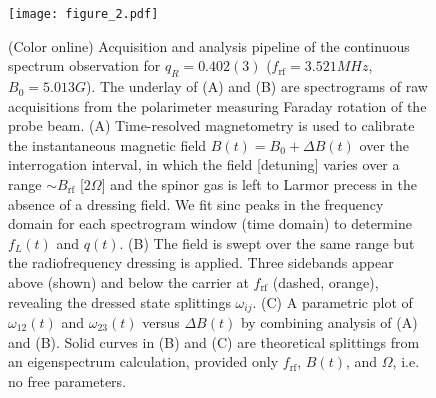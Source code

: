 \documentclass[aps,prl,reprint,superscriptaddress,floatfix]{revtex4-1}
\begin{document}
\begin{figure}
    \centering
    \texttt{[image: figure\_2.pdf]}
    \caption{
    \label{fig:acquisition_pipeline}
        (Color online)
        Acquisition and analysis pipeline of the continuous spectrum observation for $q_R = 0.402(3)$ ($f_{\text{rf}}=3.521\unit{MHz}$, $B_0=5.013\unit{G}$).
        The underlay of (A) and (B) are spectrograms of raw acquisitions from the polarimeter measuring Faraday rotation of the probe beam.
        (A) Time-resolved magnetometry is used to calibrate the instantaneous magnetic field $B(t) = B_0 + \Delta B(t)$ over the interrogation interval, in which the field [detuning] varies over a range $\sim B_{\text{rf}}$ [$2\Omega$] and the spinor gas is left to Larmor precess in the absence of a dressing field.
        We fit sinc peaks in the frequency domain for each spectrogram window (time domain) to determine $f_L(t)$ and $q(t)$.
       (B) The field is swept over the same range but the radiofrequency dressing is applied.
       Three sidebands appear above (shown) and below the carrier at $f_{\text{rf}}$ (dashed, orange), revealing the dressed state splittings $\omega_{ij}$.
       (C) A parametric plot of $\omega_{12}(t)$ and $\omega_{23}(t)$ versus $\Delta B(t)$ by combining analysis of (A) and (B).
       Solid curves in (B) and (C) are theoretical splittings from an eigenspectrum calculation, provided only $f_{\text{rf}}$, $B(t)$, and $\Omega$, i.e. no free parameters.
    }
\end{figure}
\end{document}
